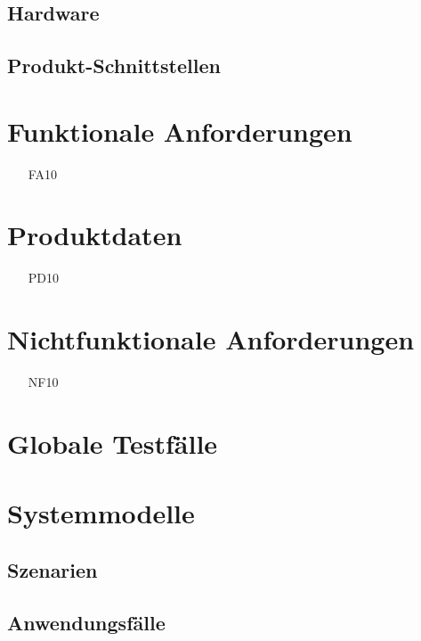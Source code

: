 \documentclass[titlepage=true, parskip=full]{scrartcl}
\begin{document}
\subsection{Hardware}

\subsection{Produkt-Schnittstellen}

\section{Funktionale Anforderungen}
\begin{itemize}[nosep]
	\item[FA10]
\end{itemize}

\section{Produktdaten}
\begin{itemize}[nosep]
	\item[PD10]
\end{itemize}

\section{Nichtfunktionale Anforderungen}
\begin{itemize}[nosep]
\item[NF10]
\end{itemize}

\section{Globale Testfälle}
\section{Systemmodelle}

\subsection{Szenarien}

\subsection{Anwendungsfälle}
\end{document}
